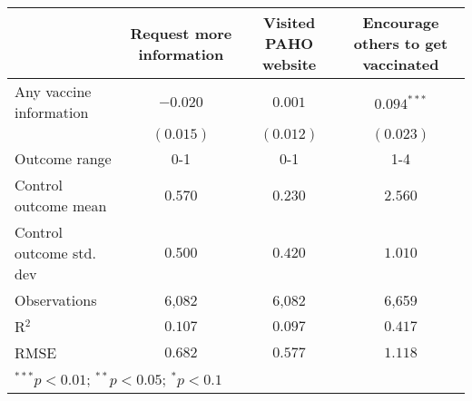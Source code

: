 \begin{table}
\begin{center}
\begin{tabular}{l c c c}
\hline
 & Request more information & Visited PAHO website & Encourage others to get vaccinated \\
\hline
Any vaccine information  & $-0.020$  & $0.001$   & $0.094^{***}$ \\
                         & $(0.015)$ & $(0.012)$ & $(0.023)$     \\
\hline
Outcome range            & 0-1       & 0-1       & 1-4           \\
Control outcome mean     & $0.570$   & $0.230$   & $2.560$       \\
Control outcome std. dev & $0.500$   & $0.420$   & $1.010$       \\
Observations             & 6,082     & 6,082     & 6,659         \\
R$^{2}$                  & $0.107$   & $0.097$   & $0.417$       \\
RMSE                     & $0.682$   & $0.577$   & $1.118$       \\
\hline
\multicolumn{4}{l}{\scriptsize{$^{***}p<0.01$; $^{**}p<0.05$; $^{*}p<0.1$}}
\end{tabular}
\caption{}
\label{table:Tables and Figures/SI_table21_anyinfo_pooled_behav}
\end{center}
\end{table}
